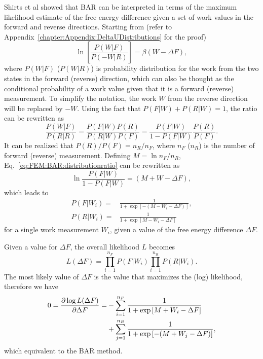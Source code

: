 Shirts et al showed that BAR can be interpreted in terms of the maximum likelihood estimate of the free energy difference given a set of work values in the forward and reverse directions.\cite{ShirtsPRL2003} Starting from (refer to Appendix~\ref{chapter:Appendix:DeltaUDistributions} for the proof)
\begin{equation}
	\ln\left[\frac{P(W|F)}{P(-W|R)}\right]=\beta (W-\Delta F),
	\label{eq:FEM:BAR:distributionratio}
\end{equation}
where $P(W|F)$ ($P(W|R)$) is probability distribution for the work from the two states in the forward (reverse) direction, which can also be thought as the conditional probability of a work value given that it is a forward (reverse) measurement. To simplify the notation, the work $W$ from the reverse direction will be replaced by $-W$. Using the fact that $P(F|W)+P(R|W)=1$, the ratio can be rewritten as
\begin{equation}
	\frac{P(W|F)}{P(R|R)}=\frac{P(F|W)P(R)}{P(R|W)P(F)}=\frac{P(F|W)}{1-P(F|W)}\frac{P(R)}{P(F)}.
\end{equation}
It can be realized that $P(R)/P(F)=n_R/n_F$, where $n_F$ ($n_R$) is the number of forward (reverse) measurement. Defining $M=\ln{n_F/n_R}$, Eq.~\ref{eq:FEM:BAR:distributionratio} can be rewritten as
\begin{equation}
	\ln\frac{P(F|W)}{1-P(F|W)}=(M+W-\Delta F),
\end{equation}
which leads to
\begin{align}
	P(F|W_i)=&\frac{1}{1+\exp[-(M-W_i-\Delta F)]},\\
	P(R|W_i)=&\frac{1}{1+\exp[M-W_i-\Delta F]}
\end{align}
for a single work measurement $W_i$, given a value of the free energy difference $\Delta F$.

Given a value for $\Delta F$, the overall likelihood $L$ becomes
\begin{equation}
	L(\Delta F)=\prod_{i=1}^{n_F}P(F|W_i)\prod_{i=1}^{n_R}P(R|W_i).
\end{equation}
The most likely value of $\Delta F$ is the value that maximizes the (log) likelihood, therefore we have
\begin{align}
	0=\frac{\partial \log L(\Delta F)}{\partial \Delta F}=&-\sum_{i=1}^{n_F}\frac{1}{1+\exp\left[M+W_i-\Delta F\right]}\notag\\
	                                                      &+\sum_{j=1}^{n_R}\frac{1}{1+\exp\left[-(M+W_j-\Delta F)\right]},
\end{align}
which equivalent to the BAR method.